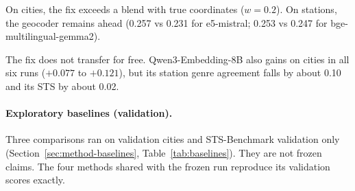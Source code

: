 On cities, the fix exceeds a blend with true coordinates ($w=0.2$). On stations, the geocoder remains ahead (0.257 vs 0.231 for e5-mistral; 0.253 vs 0.247 for bge-multilingual-gemma2).

The fix does not transfer for free. Qwen3-Embedding-8B also gains on cities in all six runs ($+0.077$ to $+0.121$), but its station genre agreement falls by about 0.10 and its STS by about 0.02.
\paragraph{Exploratory baselines (validation).}
Three comparisons ran on validation cities and STS-Benchmark validation only (Section~\ref{sec:method-baselines}, Table~\ref{tab:baselines}). They are not frozen claims. The four methods shared with the frozen run reproduce its validation scores exactly.

